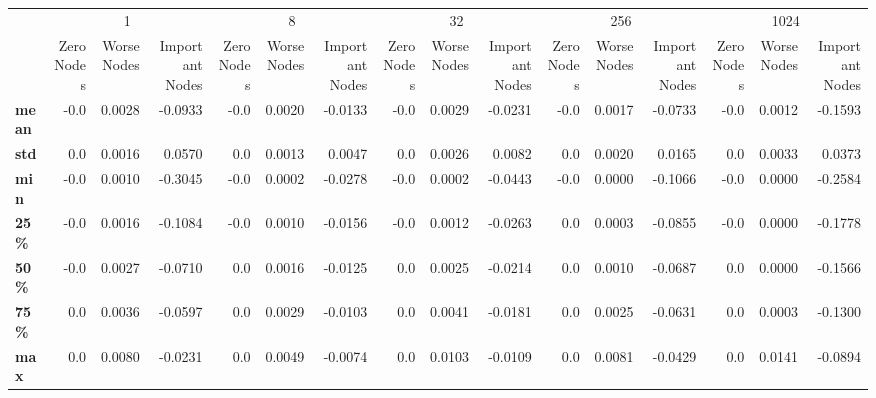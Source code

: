 \begin{tabular}{lrrrrrrrrrrrrrrr}
\toprule
{} & \multicolumn{3}{c}{1} & \multicolumn{3}{c}{8} & \multicolumn{3}{c}{32} & \multicolumn{3}{c}{256} & \multicolumn{3}{c}{1024} \\
{} & Zero Nodes & Worse Nodes & Important Nodes & Zero Nodes & Worse Nodes & Important Nodes & Zero Nodes & Worse Nodes & Important Nodes & Zero Nodes & Worse Nodes & Important Nodes & Zero Nodes & Worse Nodes & Important Nodes \\
\midrule
\textbf{mean} &       -0.0 &      0.0028 &         -0.0933 &       -0.0 &      0.0020 &         -0.0133 &       -0.0 &      0.0029 &         -0.0231 &       -0.0 &      0.0017 &         -0.0733 &       -0.0 &      0.0012 &         -0.1593 \\
\textbf{std } &        0.0 &      0.0016 &          0.0570 &        0.0 &      0.0013 &          0.0047 &        0.0 &      0.0026 &          0.0082 &        0.0 &      0.0020 &          0.0165 &        0.0 &      0.0033 &          0.0373 \\
\textbf{min } &       -0.0 &      0.0010 &         -0.3045 &       -0.0 &      0.0002 &         -0.0278 &       -0.0 &      0.0002 &         -0.0443 &       -0.0 &      0.0000 &         -0.1066 &       -0.0 &      0.0000 &         -0.2584 \\
\textbf{25\% } &       -0.0 &      0.0016 &         -0.1084 &       -0.0 &      0.0010 &         -0.0156 &       -0.0 &      0.0012 &         -0.0263 &        0.0 &      0.0003 &         -0.0855 &       -0.0 &      0.0000 &         -0.1778 \\
\textbf{50\% } &       -0.0 &      0.0027 &         -0.0710 &        0.0 &      0.0016 &         -0.0125 &        0.0 &      0.0025 &         -0.0214 &        0.0 &      0.0010 &         -0.0687 &        0.0 &      0.0000 &         -0.1566 \\
\textbf{75\% } &        0.0 &      0.0036 &         -0.0597 &        0.0 &      0.0029 &         -0.0103 &        0.0 &      0.0041 &         -0.0181 &        0.0 &      0.0025 &         -0.0631 &        0.0 &      0.0003 &         -0.1300 \\
\textbf{max } &        0.0 &      0.0080 &         -0.0231 &        0.0 &      0.0049 &         -0.0074 &        0.0 &      0.0103 &         -0.0109 &        0.0 &      0.0081 &         -0.0429 &        0.0 &      0.0141 &         -0.0894 \\
\bottomrule
\end{tabular}
